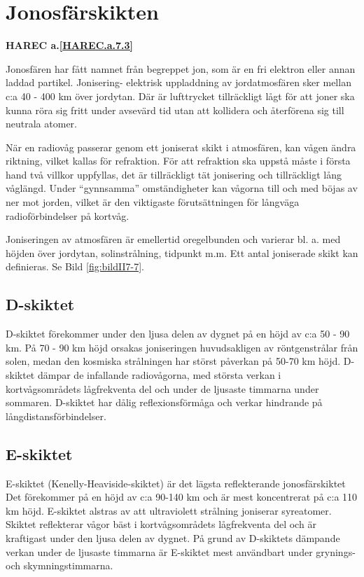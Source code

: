 \section{Jonosfärskikten}
\textbf{
HAREC a.\ref{HAREC.a.7.3}\label{myHAREC.a.7.3}
}

Jonosfären har fått namnet från begreppet jon, som är en fri elektron
eller annan laddad partikel. Jonisering- elektrisk uppladdning av
jordatmosfären sker mellan c:a 40 - 400 km över jordytan. Där är
lufttrycket tillräckligt lågt för att joner ska kunna röra sig fritt
under avsevärd tid utan att kollidera och återförena sig till neutrala
atomer.

När en radiovåg passerar genom ett joniserat skikt i atmosfären,
kan vågen ändra riktning, vilket kallas för refraktion. För att
refraktion ska uppstå måste i första hand två villkor uppfyllas, det
är tillräckligt tät jonisering och tillräckligt lång våglängd. Under
``gynnsamma'' omständigheter kan vågorna till och med böjas av ner mot
jorden, vilket är den viktigaste förutsättningen för långväga
radioförbindelser på kortvåg.

Joniseringen av atmosfären är emellertid oregelbunden och varierar
bl. a. med höjden över jordytan, solinstrålning, tidpunkt m.m.  Ett
antal joniserade skikt kan definieras.  Se Bild \ref{fig:bildII7-7}.

\subsection{D-skiktet}

D-skiktet förekommer under den ljusa delen av dygnet på en höjd av c:a
50 - 90 km. På 70 - 90 km höjd orsakas joniseringen huvudsakligen av
röntgenstrålar från solen, medan den kosmiska strålningen har störst
påverkan på 50-70 km höjd. D-skiktet dämpar de infallande
radiovågorna, med största verkan i kortvågsområdets lågfrekventa del
och under de ljusaste timmarna under sommaren.  D-skiktet har dålig
reflexionsförmåga och verkar hindrande på långdistansförbindelser.

\subsection{E-skiktet}

E-skiktet (Kenelly-Heaviside-skiktet) är det lägsta reflekterande
jonosfärskiktet Det förekommer på en höjd av c:a 90-140 km och är mest
koncentrerat på c:a 110 km höjd. E-skiktet alstras av att ultraviolett
strålning joniserar syreatomer. Skiktet reflekterar vågor bäst i
kortvågsområdets lågfrekventa del och är kraftigast under den ljusa
delen av dygnet. På grund av D-skiktets dämpande verkan under de
ljusaste timmarna är E-skiktet mest användbart under grynings- och
skymningstimmarna.

